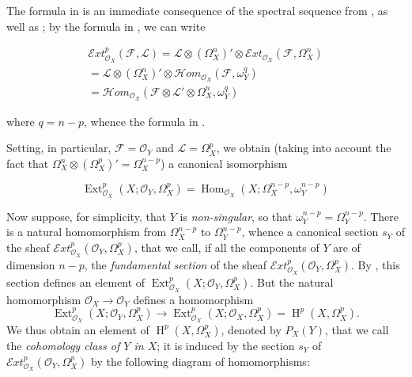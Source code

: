 \begin{cproof}

  The formula in  is an immediate consequence of the spectral sequence from , as well as ;
  by the formula in , we can write

  \begin{align*}
    \mathcal{E}xt_{\mathcal{O}_X}^p(\mathcal{F},\mathcal{L})
    = \mathcal{L}\otimes(\Omega_X^n)'\otimes\mathcal{E}xt_{\mathcal{O}_X}(\mathcal{F},\Omega_X^n)
    \\= \mathcal{L}\otimes(\Omega_X^n)'\otimes\mathcal{H}om_{\mathcal{O}_X}(\mathcal{F},\omega_Y^q)
    \\= \mathcal{H}om_{\mathcal{O}_X}(\mathcal{F}\otimes\mathcal{L}'\otimes\Omega_X^n,\omega_Y^q)
  \end{align*}

  where $q=n-p$, whence the formula in .
\end{cproof}

Setting, in particular, $\mathcal{F}=\mathcal{O}_Y$ and $\mathcal{L}=\Omega_X^p$, we obtain (taking into account the fact that $\Omega_X^n\otimes(\Omega_X^p)'=\Omega_X^{n-p}$) a canonical isomorphism

\begin{equation}\tag{4.2}\label{fga1-equation-4.2}
  \operatorname{Ext}_{\mathcal{O}_X}^p(X;\mathcal{O}_Y,\Omega_X^p) = \operatorname{Hom}_{\mathcal{O}_X}(X;\Omega_X^{n-p},\omega_Y^{n-p})
\end{equation}

Now suppose, for simplicity, that $Y$ is \emph{non-singular}, so that $\omega_Y^{n-p}=\Omega_Y^{n-p}$.
There is a natural homomorphism from $\Omega_X^{n-p}$ to $\Omega_Y^{n-p}$, whence a canonical section $s_Y$ of the sheaf $\mathcal{E}xt_{\mathcal{O}_X}^p(\mathcal{O}_Y,\Omega_X^p)$, that we call, if all the components of $Y$ are of dimension $n-p$, the \emph{fundamental section} of the sheaf $\mathcal{E}xt_{\mathcal{O}_X}^p(\mathcal{O}_Y,\Omega_X^p)$.
By , this section defines an element of $\operatorname{Ext}_{\mathcal{O}_X}^p(X;\mathcal{O}_Y,\Omega_X^p)$.
But the natural homomorphism $\mathcal{O}_X\to\mathcal{O}_Y$ defines a homomorphism
\[
  \operatorname{Ext}_{\mathcal{O}_X}^p(X;\mathcal{O}_Y,\Omega_X^p)
  \to \operatorname{Ext}_{\mathcal{O}_X}^p(X;\mathcal{O}_X,\Omega_X^p)
  = \operatorname{H}^p(X,\Omega_X^p).
\]
We thus obtain an element of $\operatorname{H}^p(X,\Omega_X^p)$, denoted by $P_X(Y)$, that we call the \emph{cohomology class of $Y$ in $X$};
it is induced by the section $s_Y$ of $\mathcal{E}xt_{\mathcal{O}_X}^p(\mathcal{O}_Y,\Omega_X^p)$ by the following diagram of homomorphisms:


